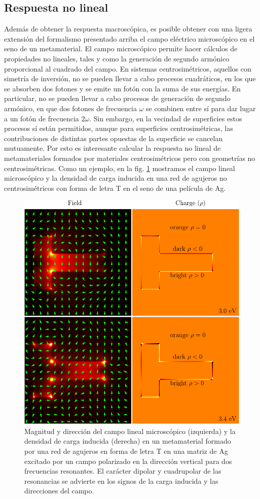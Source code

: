 \documentclass[12pt]{article}
\begin{document}
\subsection{Respuesta no lineal}

Además de obtener la respuesta macroscópica, es posible obtener con
una ligera extensión del formalismo presentado arriba el campo
eléctrico microscópico en el seno de un metamaterial. El campo
microscópico permite hacer cálculos de propiedades no lineales, tales
y como la generación de segundo armónico proporcional al cuadrado del
campo. En sistemas
centrosimétricos, aquellos con simetría de inversión, no se pueden
llevar a cabo procesos cuadráticos, en los que se absorben dos fotones
y se emite un fotón con la suma de sus energías. En particular, no se
pueden llevar a cabo procesos de generación de segundo armónico, en
que dos fotones de frecuencia $\omega$ se combinen entre sí para dar
lugar a un fotón de frecuencia $2\omega$. Sin embargo, en la vecindad
de superficies estos procesos sí están permitidos, aunque para
superficies centrosimétricas, las contribuciones de distintas partes
opuestas de la superficie se cancelan mutuamente. Por esto es
interesante calcular la respuesta no lineal de metamateriales formados
por materiales centrosimétricos pero con geometrías no
centrosimétricas. Como un ejemplo,\cite{bms19} en la fig. \ref{fig:lineal}
mostramos el campo lineal microscópico y la densidad de carga inducida
en una red de agujeros no centrosimétricos con forma de letra T en el
seno de una película de Ag.
\begin{figure}
  \centering
  \includegraphics[width=.7\textwidth]{figshg5}
  \caption{Magnitud y dirección del campo lineal microscópico
    (izquierda) y la densidad de carga inducida (derecha) en un
    metamaterial formado por una red de agujeros en forma de letra T
    en una matriz de Ag excitado por un campo polarizado en la
    dirección vertical para dos frecuencias resonantes. El carácter
    dipolar y cuadrupolar de las resonancias se advierte en los signos
    de la carga inducida y las direcciones del campo.}
  \label{fig:lineal}
\end{figure}
\end{document}
